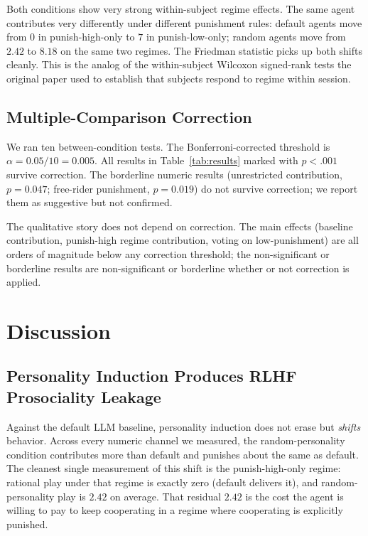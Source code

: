 \documentclass[12pt, a4paper]{article}
\begin{document}
Both conditions show very strong within-subject regime effects. The same agent contributes very differently under different punishment rules: default agents move from $0$ in punish-high-only to $7$ in punish-low-only; random agents move from $2.42$ to $8.18$ on the same two regimes. The Friedman statistic picks up both shifts cleanly. This is the analog of the within-subject Wilcoxon signed-rank tests the original paper used to establish that subjects respond to regime within session.

\subsection{Multiple-Comparison Correction}

We ran ten between-condition tests. The Bonferroni-corrected threshold is $\alpha=0.05/10=0.005$. All results in Table~\ref{tab:results} marked with $p<.001$ survive correction. The borderline numeric results (unrestricted contribution, $p=0.047$; free-rider punishment, $p=0.019$) do not survive correction; we report them as suggestive but not confirmed.

The qualitative story does not depend on correction. The main effects (baseline contribution, punish-high regime contribution, voting on low-punishment) are all orders of magnitude below any correction threshold; the non-significant or borderline results are non-significant or borderline whether or not correction is applied.

\section{Discussion}
\label{sec:discussion}

\subsection{Personality Induction Produces RLHF Prosociality Leakage}

Against the default LLM baseline, personality induction does not erase but \emph{shifts} behavior. Across every numeric channel we measured, the random-personality condition contributes more than default and punishes about the same as default. The cleanest single measurement of this shift is the punish-high-only regime: rational play under that regime is exactly zero (default delivers it), and random-personality play is $2.42$ on average. That residual $2.42$ is the cost the agent is willing to pay to keep cooperating in a regime where cooperating is explicitly punished.
\end{document}
